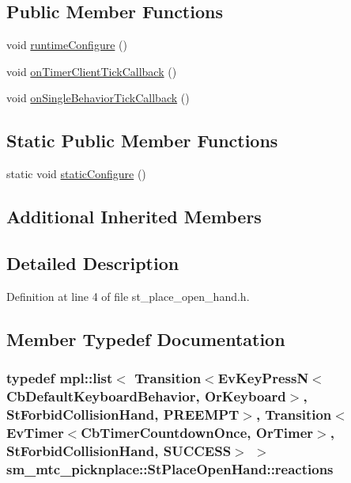 \subsection*{Public Member Functions}
\begin{DoxyCompactItemize}
\item 
void \hyperlink{structsm__mtc__picknplace_1_1StPlaceOpenHand_a74f0473c51a5203259f0a22ce4834724}{runtime\+Configure} ()
\item 
void \hyperlink{structsm__mtc__picknplace_1_1StPlaceOpenHand_a25a16ee3729d36f981451bbca870b0af}{on\+Timer\+Client\+Tick\+Callback} ()
\item 
void \hyperlink{structsm__mtc__picknplace_1_1StPlaceOpenHand_a2f067bfd77400d702dbfbfaae5577a10}{on\+Single\+Behavior\+Tick\+Callback} ()
\end{DoxyCompactItemize}
\subsection*{Static Public Member Functions}
\begin{DoxyCompactItemize}
\item 
static void \hyperlink{structsm__mtc__picknplace_1_1StPlaceOpenHand_a81b52d02922373dafd311faa2695ef2b}{static\+Configure} ()
\end{DoxyCompactItemize}
\subsection*{Additional Inherited Members}


\subsection{Detailed Description}


Definition at line 4 of file st\+\_\+place\+\_\+open\+\_\+hand.\+h.



\subsection{Member Typedef Documentation}
\subsubsection[{\texorpdfstring{reactions}{reactions}}]{\setlength{\rightskip}{0pt plus 5cm}typedef mpl\+::list$<$ Transition$<$Ev\+Key\+PressN$<$Cb\+Default\+Keyboard\+Behavior, {\bf Or\+Keyboard}$>$, {\bf St\+Forbid\+Collision\+Hand}, {\bf P\+R\+E\+E\+M\+PT}$>$, Transition$<$Ev\+Timer$<$Cb\+Timer\+Countdown\+Once, {\bf Or\+Timer}$>$, {\bf St\+Forbid\+Collision\+Hand}, {\bf S\+U\+C\+C\+E\+SS}$>$ $>$ {\bf sm\+\_\+mtc\+\_\+picknplace\+::\+St\+Place\+Open\+Hand\+::reactions}}\hypertarget{structsm__mtc__picknplace_1_1StPlaceOpenHand_aae904256bb142f18994f4c28dce0083f}{}\label{structsm__mtc__picknplace_1_1StPlaceOpenHand_aae904256bb142f18994f4c28dce0083f}


